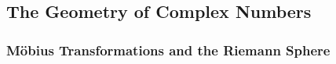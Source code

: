 \subsection{The Geometry of Complex Numbers}
\subsubsection{Möbius Transformations and the Riemann Sphere}

